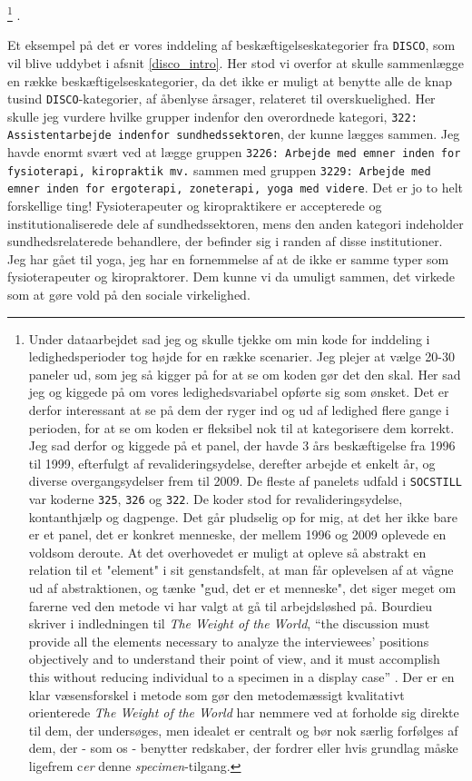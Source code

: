 \footnote{Under dataarbejdet sad jeg og skulle tjekke om min kode for inddeling i ledighedsperioder tog højde for en række scenarier. Jeg plejer at vælge 20-30 paneler ud, som jeg så kigger på for at se om koden gør det den skal. Her sad jeg og kiggede på om vores ledighedsvariabel opførte sig som ønsket. Det er derfor interessant at se på dem der ryger ind og ud af ledighed flere gange i perioden, for at se om koden er fleksibel nok til at kategorisere dem korrekt. Jeg sad derfor og kiggede på et panel, der havde 3 års beskæftigelse fra 1996 til 1999, efterfulgt af revalideringsydelse, derefter arbejde et enkelt år, og diverse overgangsydelser frem til 2009. De fleste af panelets udfald i \texttt{SOCSTILL} var koderne \texttt{325}, \texttt{326} og \texttt{322}. De koder stod for revalideringsydelse, kontanthjælp og dagpenge. Det går pludselig op for mig, at det her ikke bare er et panel, det er konkret menneske, der mellem 1996 og 2009 oplevede en voldsom deroute. At det overhovedet er muligt at opleve så abstrakt en relation til et "element" i sit genstandsfelt, at man får oplevelsen af at vågne ud af abstraktionen, og tænke "gud, det er et menneske", det siger meget om farerne ved den metode vi har valgt at gå til arbejdsløshed på. Bourdieu skriver i indledningen til \emph{The Weight of the World}, “the discussion must provide all the elements necessary to analyze the interviewees' positions objectively and to understand their point of view, and it must accomplish this without reducing individual to a specimen in a display case” \parencite[2]{Bourdieu1999}. Der er en klar væsensforskel i metode som gør den metodemæssigt kvalitativt orienterede \emph{The Weight of the World} har nemmere ved at forholde sig direkte til dem, der undersøges, men idealet er centralt og bør nok særlig forfølges af dem, der - som os - benytter redskaber, der fordrer eller hvis grundlag måske ligefrem c\emph{er} denne \emph{specimen}-tilgang.}%
%
 . 

Et eksempel på det er vores inddeling af beskæftigelseskategorier fra \texttt{DISCO}, som vil blive uddybet i afsnit \ref{disco_intro}. Her stod vi overfor at skulle sammenlægge en række beskæftigelseskategorier, da det ikke er muligt at benytte alle de knap tusind \texttt{DISCO}-kategorier, af åbenlyse årsager, relateret til overskuelighed. Her skulle jeg vurdere hvilke grupper indenfor den overordnede kategori, \texttt{322: Assistentarbejde indenfor sundhedssektoren}, der kunne lægges sammen. Jeg havde enormt svært ved at lægge gruppen \texttt{3226: Arbejde med emner inden for fysioterapi, kiropraktik mv.} sammen med gruppen \texttt{3229: Arbejde med emner inden for ergoterapi, zoneterapi, yoga med videre}. Det er jo to helt forskellige ting! Fysioterapeuter og kiropraktikere er accepterede og institutionaliserede dele af sundhedssektoren, mens den anden kategori indeholder sundhedsrelaterede behandlere, der befinder sig i randen af disse institutioner. Jeg har gået til yoga, jeg har en fornemmelse af at de ikke er samme typer som fysioterapeuter og kiropraktorer. Dem kunne vi da umuligt sammen, det virkede som at gøre vold på den sociale virkelighed.  

